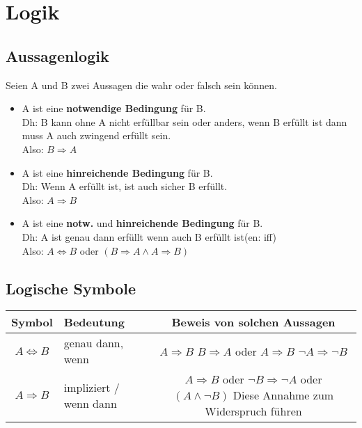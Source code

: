 \section{Logik}
\subsection{Aussagenlogik}
Seien A und B zwei Aussagen die wahr oder falsch sein können.
\begin{itemize}
	\item A ist eine \textbf{notwendige Bedingung} für B. \\
	Dh: B kann ohne A nicht erfüllbar sein oder anders, wenn B erfüllt ist dann muss A auch zwingend erfüllt sein. \\
	Also: $B \Rightarrow A$

	\item A ist eine \textbf{hinreichende Bedingung} für B. \\
	Dh: Wenn A erfüllt ist, ist auch sicher B erfüllt. \\
	Also: $A \Rightarrow B$

	\item A ist eine \textbf{notw.} und \textbf{hinreichende Bedingung} für B.\\
	Dh: A ist genau dann erfüllt wenn auch B erfüllt ist\small{(en: iff)}\\
	Also: $A \Leftrightarrow B$ oder $(B \Rightarrow A \wedge A \Rightarrow B)$
\end{itemize}

\subsection{Logische Symbole}
{\footnotesize
\begin{tabular}{|c|l|c|}\hline
	\textbf{Symbol} & \textbf{Bedeutung} & \textbf{Beweis von solchen Aussagen}\\\hline
	$A \Leftrightarrow B$ & genau dann, wenn & \pbox{2cm}{$A \Rightarrow B$ \\ $B \Rightarrow A$} oder \pbox{2cm}{$A \Rightarrow B$ \\ $\neg A \Rightarrow \neg B$} \\\hline
	$A \Rightarrow B$ & impliziert / wenn dann & \pbox{4cm}{$A \Rightarrow B$ oder $\neg B \Rightarrow \neg A$ oder\\$(A \wedge \neg B)$ Diese Annahme zum Widerspruch führen}\\
	\hline
\end{tabular}
}